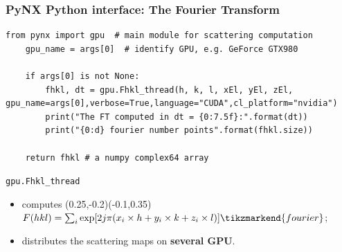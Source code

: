 \documentclass[]{beamer}
\begin{document}
\begin{frame}[fragile]
\frametitle{PyNX Python interface: The Fourier Transform}
\begin{lstlisting}[firstnumber=31]
    from pynx import gpu  # main module for scattering computation
    gpu_name = args[0]  # identify GPU, e.g. GeForce GTX980  
    
    if args[0] is not None:
        fhkl, dt = gpu.Fhkl_thread(h, k, l, xEl, yEl, zEl,   gpu_name=args[0],verbose=True,language="CUDA",cl_platform="nvidia")
        print("The FT computed in dt = {0:7.5f}:".format(dt))
        print("{0:d} fourier number points".format(fhkl.size))
        
    return fhkl # a numpy complex64 array  
\end{lstlisting}
\begin{block}{\texttt{gpu.Fhkl\_thread}}
\begin{itemize}
\item \small computes (0.25,-0.2)(-0.1,0.35)$F(hkl) = \sum_{i}\exp[2j\pi(x_{i}\times h + y_{i} \times k + z_{i} \times l)]\tikzmarkend{fourier}$;
\item \small distributes the scattering maps on \textbf{several GPU}.
\end{itemize}
\end{block}
\end{frame}

\end{document}
